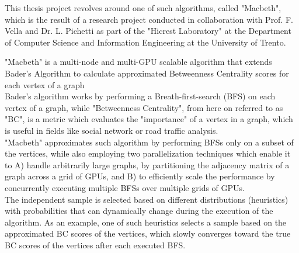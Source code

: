 This thesis project revolves around one of such algorithms, called "Macbeth", which is the result of a research project conducted in collaboration with Prof. F. Vella and Dr. L. Pichetti as part of the "Hicrest Laboratory" at the Department of Computer Science and Information Engineering at the University of Trento.

"Macbeth" is a multi-node and multi-GPU scalable algorithm that extends Bader's Algorithm to calculate approximated Betweenness Centrality scores for each vertex of a graph\\
Bader's algorithm works by performing a Breath-first-search (BFS) on each vertex of a graph, while
"Betweenness Centrality", from here on referred to as "BC", is a metric which evaluates the "importance" of a vertex in a graph, which is useful in fields like social network or road traffic analysis. \\
"Macbeth" approximates such algorithm by performing BFSs only on a subset of the vertices, while also employing two parallelization techniques which enable it to A) handle arbitrarily large graphs, by partitioning the adjacency matrix of a graph across a grid of GPUs, and B) to efficiently scale the performance by concurrently executing multiple BFSs over multiple grids of GPUs.\\
The independent sample is selected based on different distributions (heuristics) with probabilities that can dynamically change during the execution of the algorithm. As an example, one of such heuristics selects a sample based on the approximated BC scores of the vertices, which slowly converges toward the true BC scores of the vertices after each executed BFS.

